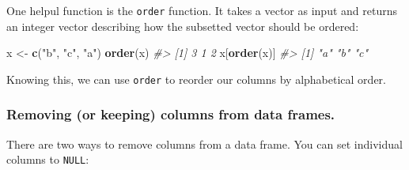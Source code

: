 \documentclass[]{book}
\newenvironment{Shaded}{\begin{snugshade}}{\end{snugshade}}
\newcommand{\CommentTok}[1]{\textcolor[rgb]{0.56,0.35,0.01}{\textit{#1}}}
\newcommand{\DataTypeTok}[1]{\textcolor[rgb]{0.13,0.29,0.53}{#1}}
\newcommand{\KeywordTok}[1]{\textcolor[rgb]{0.13,0.29,0.53}{\textbf{#1}}}
\newcommand{\NormalTok}[1]{#1}
\newcommand{\OperatorTok}[1]{\textcolor[rgb]{0.81,0.36,0.00}{\textbf{#1}}}
\newcommand{\OtherTok}[1]{\textcolor[rgb]{0.56,0.35,0.01}{#1}}
\newcommand{\StringTok}[1]{\textcolor[rgb]{0.31,0.60,0.02}{#1}}
\begin{document}
One helpul function is the \texttt{order} function. It takes a vector as input and returns an integer vector describing how the subsetted vector should be ordered:

\begin{Shaded}
\begin{Highlighting}[]
\NormalTok{x <-}\StringTok{ }\KeywordTok{c}\NormalTok{(}\StringTok{"b"}\NormalTok{, }\StringTok{"c"}\NormalTok{, }\StringTok{"a"}\NormalTok{)}
\KeywordTok{order}\NormalTok{(x)}
\CommentTok{#> [1] 3 1 2}
\NormalTok{x[}\KeywordTok{order}\NormalTok{(x)]}
\CommentTok{#> [1] "a" "b" "c"}
\end{Highlighting}
\end{Shaded}

Knowing this, we can use \texttt{order} to reorder our columns by alphabetical order.

\hypertarget{removing-or-keeping-columns-from-data-frames.}{%
\subsubsection*{Removing (or keeping) columns from data frames.}\label{removing-or-keeping-columns-from-data-frames.}}

There are two ways to remove columns from a data frame. You can set individual columns to \texttt{NULL}:

\begin{Shaded}
\end{Shaded}
\end{document}
